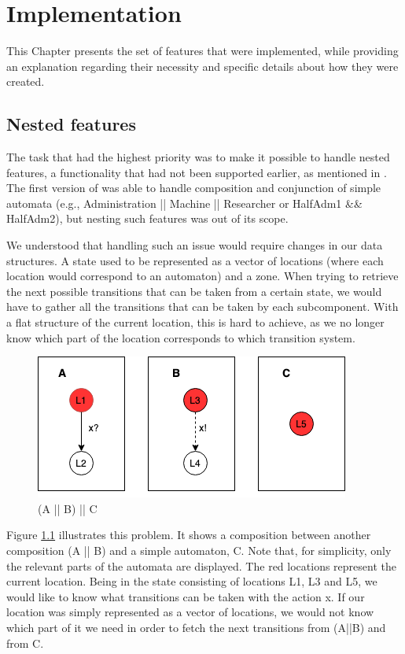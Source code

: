 \chapter{Implementation}\label{ch:impl}
This Chapter presents the set of features that were implemented, while providing an explanation regarding their necessity and specific details about how they were created.


\section{Nested features}
The task that had the highest priority was to make it possible to handle nested features, a functionality that had not been supported earlier, as mentioned in \textcite{Jecdar:2019}. The first version of \jecdar was able to handle composition and conjunction of simple automata (e.g., Administration || Machine || Researcher or HalfAdm1 \&\& HalfAdm2), but nesting such features was out of its scope.

We understood that handling such an issue would require changes in our data structures. A state used to be represented as a vector of locations (where each location would correspond to an automaton) and a zone. When trying to retrieve the next possible transitions that can be taken from a certain state, we would have to gather all the transitions that can be taken by each subcomponent. With a flat structure of the current location, this is hard to achieve, as we no longer know which part of the location corresponds to which transition system.

\begin{figure}
  \centering
  \includegraphics[scale=0.7]{figures/nestedLoc.png}
  \caption{(A || B) || C}
  \label{fig:nestedLoc}
\end{figure}

Figure \ref{fig:nestedLoc} illustrates this problem. It shows a composition between another composition (A || B) and a simple automaton, C. Note that, for simplicity, only the relevant parts of the automata are displayed. The red locations represent the current location. Being in the state consisting of locations L1, L3 and L5, we would like to know what transitions can be taken with the action x. If our location was simply represented as a vector of locations, we would not know which part of it we need in order to fetch the next transitions from (A||B) and from C.

